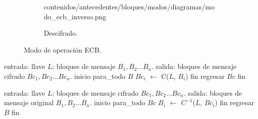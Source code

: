 \begin{figure}[H]
\begin{subfigure}{0.45\textwidth}
\begin{center}
            {contenidos/antecedentes/bloques/modos/diagramas/modo_ecb_inverso.png}
          \caption{Descifrado.}
      \end{center}
  \end{subfigure}
  \caption{Modo de operación ECB.}
  \label{figura:ecb}
\end{figure}

\begin{pseudocodigo}[caption={Modo de operación ECB, cifrado.}]
  entrada: llave $ L $; bloques de mensaje $ B_1, B_2 \dots B_n $.
  salida:  bloques de mensaje cifrado $ Bc_1, Bc_2 \dots Bc_n $.
  inicio
    para_todo $B$
      $Bc_i$ $\gets$ C($L$, $B_i$)
    fin
    regresar $Bc$
  fin
\end{pseudocodigo}

\begin{pseudocodigo}[caption={Modo de operación ECB, descifrado.}]
  entrada: llave $ L $; bloques de mensaje cifrado $ Bc_1, Bc_2 \dots Bc_n $.
  salida:  bloques de mensaje original $ B_1, B_2 \dots B_n $.
  inicio
    para_todo $Bc$
      $B_i$ $\gets$ $C^{-1}$($L$, $Bc_i$)
    fin
    regresar $B$
  fin
\end{pseudocodigo}
